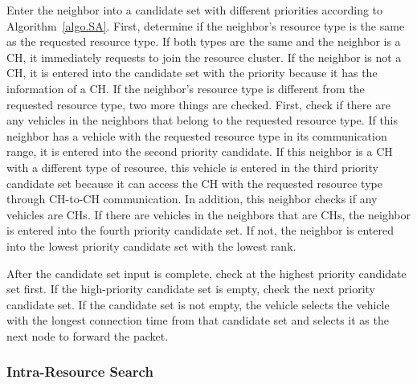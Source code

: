 \documentclass[sensors,article,accept,moreauthors,pdftex]{Definitions/mdpi}
\begin{document}
Enter the neighbor into a candidate set with different priorities according to \linebreak  Algorithm~\ref{algo.SA}. First, determine if the neighbor's resource type is the same as the requested resource type. If both types are the same and the neighbor is a CH, it immediately requests to join the resource cluster. If the neighbor is not a CH, it is entered into the candidate set with the priority because it has the information of a CH.
If the neighbor's resource type is different from the requested resource type, two more things are checked. First, check if there are any vehicles in the neighbors that belong to the requested resource type. If this neighbor has a vehicle with the requested resource type in its communication range, it is entered into the second priority candidate. If this neighbor is a CH with a different type of resource, this vehicle is entered in the third priority candidate set because it can access the CH with the requested resource type through CH-to-CH communication. In addition, this neighbor checks if any vehicles are CHs. If there are vehicles in the neighbors that are CHs, the neighbor is entered into the fourth priority candidate set. If not, the neighbor is entered into the lowest priority candidate set with the lowest rank.

After the candidate set input is complete, check at the highest priority candidate set first. If the high-priority candidate set is empty, check the next priority candidate set. If the candidate set is not empty, the vehicle selects the vehicle with the longest connection time from that candidate set and selects it as the next node to forward the packet.

\subsubsection{Intra-Resource Search}
\end{document}
